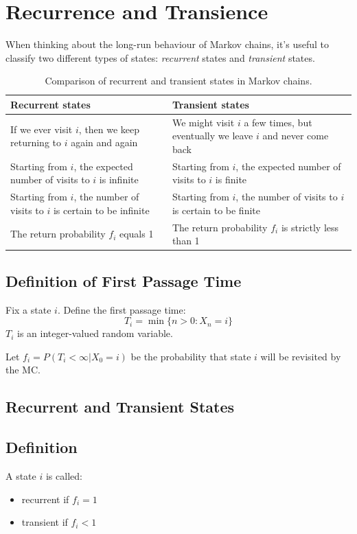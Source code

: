 \documentclass[12pt]{article}
\begin{document}
\section*{Recurrence and Transience}
When thinking about the long-run behaviour of Markov chains, it’s useful to classify two different types of states: \emph{recurrent} states and \emph{transient} states.

\begin{table}[h!]
\centering
\renewcommand{\arraystretch}{1.5}
\begin{tabular}{|m{6cm}|m{6cm}|}
\hline
\textbf{Recurrent states} & \textbf{Transient states} \\ 
\hline
If we ever visit \(i\), then we keep returning to \(i\) again and again & We might visit \(i\) a few times, but eventually we leave \(i\) and never come back \\ 
\hline
Starting from \(i\), the expected number of visits to \(i\) is infinite & Starting from \(i\), the expected number of visits to \(i\) is finite \\ 
\hline
Starting from \(i\), the number of visits to \(i\) is certain to be infinite & Starting from \(i\), the number of visits to \(i\) is certain to be finite \\ 
\hline
The return probability \(f_i\) equals 1 & The return probability \(f_i\) is strictly less than 1 \\ 
\hline
\end{tabular}
\caption{Comparison of recurrent and transient states in Markov chains.}
\end{table}
\subsection*{Definition of First Passage Time}
Fix a state $i$. Define the first passage time:
\[ T_i = \min\{n > 0: X_n = i\} \]
$T_i$ is an integer-valued random variable.

Let $f_i = P(T_i < \infty | X_0 = i)$ be the probability that state $i$ will be revisited by the MC.

\subsection*{Recurrent and Transient States}
\subsection*{Definition}
A state $i$ is called:
\begin{itemize}
    \item recurrent if $f_i = 1$
    \item transient if $f_i < 1$
\end{itemize}
\newpage
\end{document}
